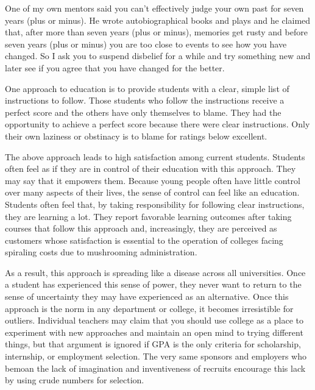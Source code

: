 One of my own mentors said you can't effectively judge your own past for
seven years (plus or minus). He wrote autobiographical books and plays
and he claimed that, after more than seven years (plus or minus),
memories get rusty and before seven years (plus or minus) you are too
close to events to see how you have changed. So I ask you to suspend
disbelief for a while and try something new and later see if you agree
that you have changed for the better.

\hypertarget{whether-perfect-should-be-average}{%
\label{whether-perfect-should-be-average}}

One approach to education is to provide students with a clear, simple
list of instructions to follow. Those students who follow the
instructions receive a perfect score and the others have only themselves
to blame. They had the opportunity to achieve a perfect score because
there were clear instructions. Only their own laziness or obstinacy is
to blame for ratings below excellent.

The above approach leads to high satisfaction among current students.
Students often feel as if they are in control of their education with
this approach. They may say that it empowers them. Because young people
often have little control over many aspects of their lives, the sense of
control can feel like an education. Students often feel that, by taking
responsibility for following clear instructions, they are learning a
lot. They report favorable learning outcomes after taking courses that
follow this approach and, increasingly, they are perceived as customers
whose satisfaction is essential to the operation of colleges facing
spiraling costs due to mushrooming administration.

As a result, this approach is spreading like a disease across all
universities. Once a student has experienced this sense of power, they
never want to return to the sense of uncertainty they may have
experienced as an alternative. Once this approach is the norm in any
department or college, it becomes irresistible for outliers. Individual
teachers may claim that you should use college as a place to experiment
with new approaches and maintain an open mind to trying different
things, but that argument is ignored if GPA is the only criteria for
scholarship, internship, or employment selection. The very same sponsors
and employers who bemoan the lack of imagination and inventiveness of
recruits encourage this lack by using crude numbers for selection.

